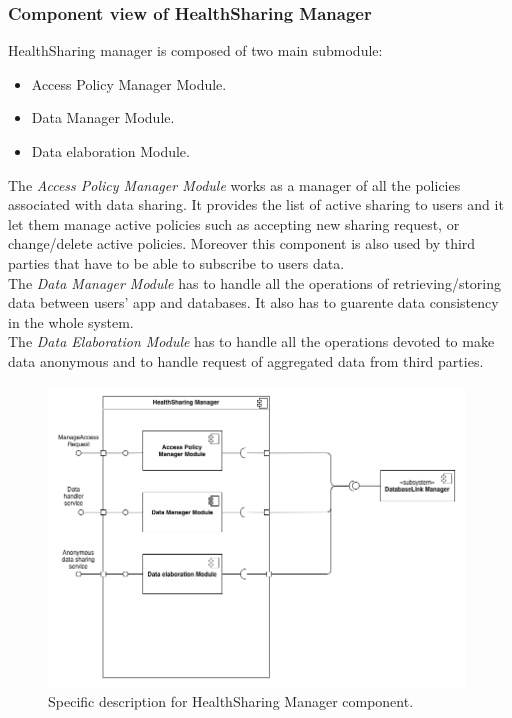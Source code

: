 \documentclass[DD.tex]{subfiles}
\begin{document}
\newpage
\subsubsection{Component view of HealthSharing Manager}
HealthSharing manager is composed of two main submodule: \begin{itemize}
	\item Access Policy Manager Module.
	\item Data Manager Module.
	\item Data elaboration Module.
\end{itemize}

The \textit{Access Policy Manager Module} works as a manager of all the policies associated with data sharing. It provides the list of active sharing to users and it let them manage active policies such as accepting new sharing request, or change/delete active policies. Moreover this component is also used by third parties that have to be able to subscribe to users data.\\
The \textit{Data Manager Module} has to handle all the operations of retrieving/storing data between users' app and databases. It also has to guarente data consistency in the whole system.
	\\
The \textit{Data Elaboration Module} has to handle all the operations devoted to make data anonymous and to handle request of aggregated data from third parties.

\begin{figure}[h!]
	\centering
	\includegraphics[height=8.00cm,keepaspectratio]{Figures/HealthSharingManagerComponent}
	\caption{Specific description for HealthSharing Manager component.}
\end{figure}
\newpage
\end{document}
